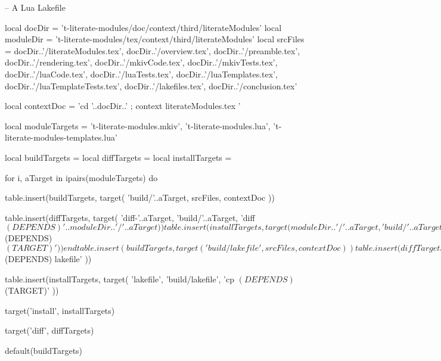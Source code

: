 \startLakefile
-- A Lua Lakefile

local docDir    = 't-literate-modules/doc/context/third/literateModules'
local moduleDir = 't-literate-modules/tex/context/third/literateModules'
local srcFiles = {
  docDir..'/literateModules.tex',
  docDir..'/overview.tex',
  docDir..'/preamble.tex',
  docDir..'/rendering.tex',
  docDir..'/mkivCode.tex',
  docDir..'/mkivTests.tex',
  docDir..'/luaCode.tex',
  docDir..'/luaTests.tex',
  docDir..'/luaTemplates.tex',
  docDir..'/luaTemplateTests.tex',
  docDir..'/lakefiles.tex',
  docDir..'/conclusion.tex'
}

local contextDoc = 
  'cd '..docDir..' ; context literateModules.tex '

local moduleTargets = {
  't-literate-modules.mkiv',
  't-literate-modules.lua',
  't-literate-modules-templates.lua'
}

local buildTargets   = { }
local diffTargets    = { }
local installTargets = { }

for i, aTarget in ipairs(moduleTargets) do

  table.insert(buildTargets, target(
    'build/'..aTarget,
    srcFiles,
    contextDoc
  ))

  table.insert(diffTargets, target(
    'diff-'..aTarget,
    'build/'..aTarget,
    'diff $(DEPENDS) '..moduleDir..'/'..aTarget
  ))

  table.insert(installTargets, target(
    moduleDir..'/'..aTarget,
    'build/'..aTarget,
    'cp $(DEPENDS) $(TARGET)'
  ))
end

table.insert(buildTargets, target(
  'build/lakefile',
  srcFiles,
  contextDoc
))

table.insert(diffTargets, target(
  'diff-lakefile',
  'build/lakefile',
  'diff $(DEPENDS) lakefile'
))

table.insert(installTargets, target(
  'lakefile',
  'build/lakefile',
  'cp $(DEPENDS) $(TARGET)'
))

target('install', installTargets)

target('diff', diffTargets)

default(buildTargets)

\stopLakefile

\stopchapter